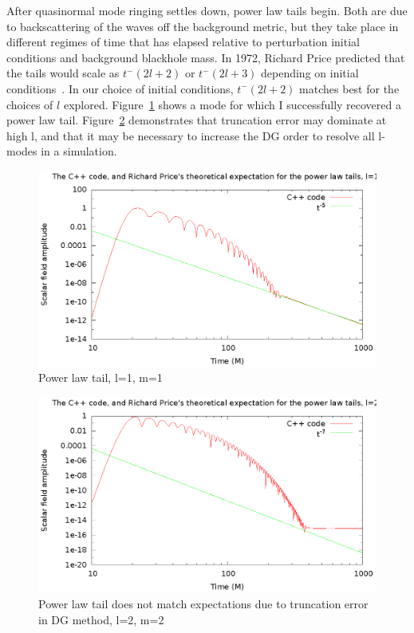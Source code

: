 After quasinormal mode ringing settles down, power law tails begin. Both are due to backscattering of the waves off the background metric, but they take place in different regimes of time that has elapsed relative to perturbation initial conditions and background blackhole mass. In 1972, Richard Price predicted that the tails would scale as $t^-(2l+2)$ or $t^-(2l+3)$ depending on initial conditions~\cite{PriceTails}. In our choice of initial conditions, $t^-(2l+2)$ matches best for the choices of $l$ explored. Figure~\ref{taill1m1} shows a mode for which I successfully recovered a power law tail. Figure~\ref{notaill2m2} demonstrates that truncation error may dominate at high l, and that it may be necessary to increase the DG order to resolve all l-modes in a simulation.

\begin{figure}
  \includegraphics{l1m1tail2}
  \caption{Power law tail, l=1, m=1}
  \label{taill1m1}
\end{figure}

\begin{figure}
  \includegraphics{l2m2tailfail2}
  \caption{Power law tail does not match expectations due to truncation error in DG method, l=2, m=2}
  \label{notaill2m2}
\end{figure}

